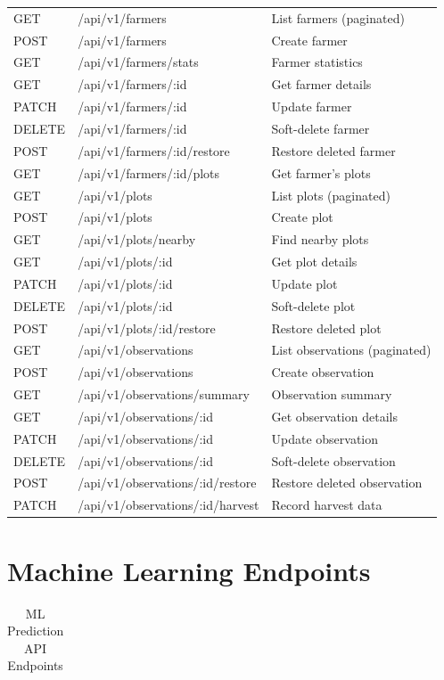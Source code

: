 \documentclass[12pt,a4paper,oneside]{report}
\begin{document}
\begin{appendix}
\begin{longtable}{lll}
\endlastfoot
GET & /api/v1/farmers & List farmers (paginated) \\
POST & /api/v1/farmers & Create farmer \\
GET & /api/v1/farmers/stats & Farmer statistics \\
GET & /api/v1/farmers/:id & Get farmer details \\
PATCH & /api/v1/farmers/:id & Update farmer \\
DELETE & /api/v1/farmers/:id & Soft-delete farmer \\
POST & /api/v1/farmers/:id/restore & Restore deleted farmer \\
GET & /api/v1/farmers/:id/plots & Get farmer's plots \\
GET & /api/v1/plots & List plots (paginated) \\
POST & /api/v1/plots & Create plot \\
GET & /api/v1/plots/nearby & Find nearby plots \\
GET & /api/v1/plots/:id & Get plot details \\
PATCH & /api/v1/plots/:id & Update plot \\
DELETE & /api/v1/plots/:id & Soft-delete plot \\
POST & /api/v1/plots/:id/restore & Restore deleted plot \\
GET & /api/v1/observations & List observations (paginated) \\
POST & /api/v1/observations & Create observation \\
GET & /api/v1/observations/summary & Observation summary \\
GET & /api/v1/observations/:id & Get observation details \\
PATCH & /api/v1/observations/:id & Update observation \\
DELETE & /api/v1/observations/:id & Soft-delete observation \\
POST & /api/v1/observations/:id/restore & Restore deleted observation \\
PATCH & /api/v1/observations/:id/harvest & Record harvest data \\
\end{longtable}

\section{Machine Learning Endpoints}
\begin{longtable}{lll}
\caption{ML Prediction API Endpoints} \\


\end{longtable}
\end{appendix}
\end{document}
